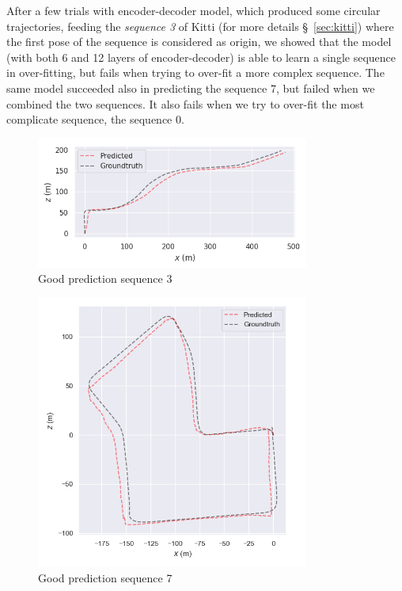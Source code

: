 After a few trials with encoder-decoder model, which produced some circular trajectories, feeding the \textit{sequence 3} of Kitti (for more details \S~\ref{sec:kitti}) where the first pose of the sequence is considered as origin, we showed that the model (with both 6 and 12 layers of encoder-decoder) is able to learn a single sequence in over-fitting, but fails when trying to over-fit a more complex sequence.
The same model succeeded also in predicting the sequence 7, but failed when we combined the two sequences.
It also fails when we try to over-fit the most complicate sequence, the sequence 0.
\begin{figure}[H]
    \centering
    \includegraphics[width=0.8\textwidth]{images/6_1_well_predicted_seq_3}
    \caption{Good prediction sequence 3}\label{fig:well-predicted-seq-3}
\end{figure}
\begin{figure}[H]
    \centering
    \includegraphics[width=0.8\textwidth]{images/6_1_well_predicted_seq_7}
    \caption{Good prediction sequence 7}\label{fig:well-predicted-seq-7}
\end{figure}

